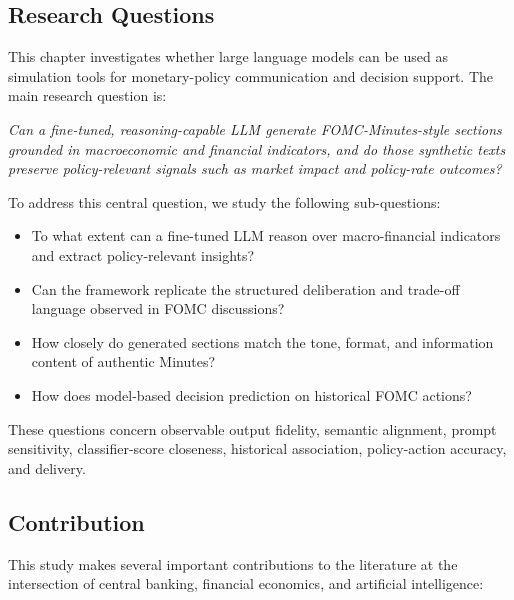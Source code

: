 \subsection*{Research Questions}

This chapter investigates whether large language models can be used as simulation tools for monetary-policy communication and decision support. The main research question is:

\textit{Can a fine-tuned, reasoning-capable LLM generate FOMC-Minutes-style sections grounded in macroeconomic and financial indicators, and do those synthetic texts preserve policy-relevant signals such as market impact and policy-rate outcomes?}

To address this central question, we study the following sub-questions:

\begin{itemize}
\item[1.] To what extent can a fine-tuned LLM reason over macro-financial indicators and extract policy-relevant insights?

\item[2.] Can the framework replicate the structured deliberation and trade-off language observed in FOMC discussions?

\item[3.] How closely do generated sections match the tone, format, and information content of authentic Minutes?

\item[4.] How does model-based decision prediction on historical FOMC actions?
\end{itemize}

These questions concern observable output fidelity, semantic alignment,
prompt sensitivity, classifier-score closeness, historical association,
policy-action accuracy, and delivery. 



\subsection*{Contribution}

This study makes several important contributions to the literature at the intersection of central banking, financial economics, and artificial intelligence:

